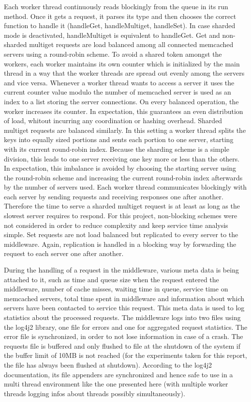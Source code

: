 \documentclass[11pt,a4paper]{article}
\begin{document}
Each worker thread continuously reads blockingly from the queue in its run method.
Once it gets a request, it parses its type and then chooses the correct function to handle it (handleGet, handleMultiget, handleSet).
In case sharded mode is deactivated, handleMultiget is equivalent to handleGet.
Get and non-sharded multiget requests are load balanced among all connected memcached servers using a round-robin scheme.
To avoid a shared token amongst the workers, each worker maintains its own counter which is initialized by the main thread in a way that the worker threads are spread out evenly among the servers and vice versa.
Whenever a worker thread wants to access a server it uses the current counter value modulo the number of memcached server is used as an index to a list storing the server connections.
On every balanced operation, the worker increases its counter.
In expectation, this guarantees an even distribution of load, whitout incurring any coordination or hashing overhead.
Sharded multiget requests are balanced similarly. In this setting a worker thread splits the keys into equally sized portions and sents each portion to one server, starting with its current round-robin index.
Because the sharding scheme is a simple division, this leads to one server receiving one key more or less than the others.
In expectation, this imbalance is avoided by choosing the starting server using the round-robin scheme and increasing the current round-robin index afterwards by the number of servers used.
Each worker thread communicates blockingly with each server by sending requests and receiving responses one after another.
Therefore the time to serve a sharded multiget request is at least as long as the slowest server requires to respond.
For this project, non-blocking schemes were not considered in order to reduce complexity and keep service time analysis simple.
Set requests are not load balanced but replicated to every server to the middleware.
Again, replication is handled in a blocking way by forwarding the request to each server one after another.

During the handling of a request in the middleware, various meta data is being attached to it, such as time and queue size when the request entered the middleware, number of cache misses, waiting time in queue, service time on memcached servers, total time spent in middleware and information about which servers have been contacted to service this request.
This meta data is used to log statistics about the processed requests.
The middleware logs into two files using the log4j2 library, one file for errors and one for aggregated request statistics.
The error file is synchronized, in order to not lose information in case of a crash.
The requests file is buffered and only flushed to file at the shutdown of the system if the buffer limit of 10MB is not reached (for the experiments taken for this report, the file has always been flushed at shutdown).
According to the log4j2 documentation, its file appenders are synchronized and hence safe to use in a multi thread environment like the one presented here (with multiple worker threads logging infos about threads possibly simultaneously).
\end{document}
